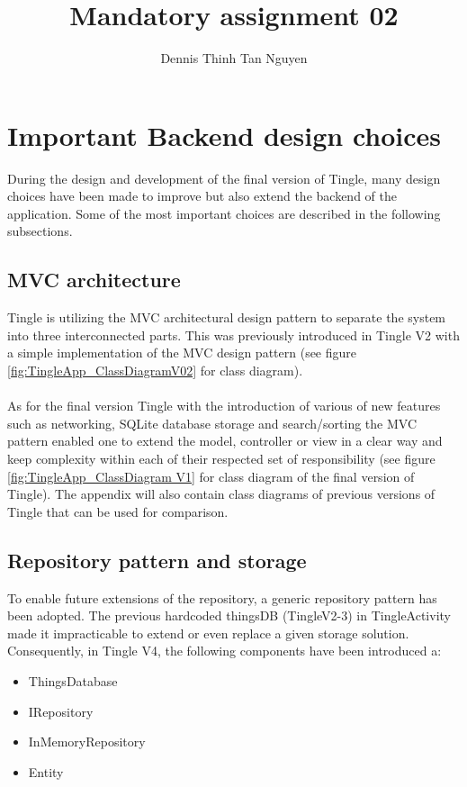 \documentclass{article}
\title{Mandatory assignment 02}
\author{Dennis Thinh Tan Nguyen}
\begin{document}
\maketitle
\newpage
\tableofcontents

\newpage
\section{Important Backend design choices}
During the design and development of the final version of Tingle, many design choices have been made to improve but also extend the backend of the application.
Some of the most important choices are described in the following subsections.


\subsection{MVC architecture}
Tingle is utilizing the MVC architectural design pattern to separate the system into three interconnected parts. This was previously introduced in Tingle V2 with a simple implementation of the MVC design pattern (see figure \ref{fig:TingleApp_ClassDiagramV02} for class diagram).\\\\As for the final version Tingle with the introduction of various of new features such as networking, SQLite database storage and search/sorting the MVC pattern enabled one to extend the model, controller or view in a clear way and keep complexity within each of their respected set of responsibility (see figure \ref{fig:TingleApp_ClassDiagram V1} for class diagram of the final version of Tingle). The appendix will also contain class diagrams of previous versions of Tingle that can be used for comparison.


\subsection{Repository pattern and storage}
To enable future extensions of the repository, a generic repository pattern has been adopted. The previous hardcoded thingsDB (TingleV2-3) in TingleActivity made it impracticable to extend or even replace a given storage solution. Consequently, in Tingle V4, the following components have been introduced a:
\begin{itemize}
	\item ThingsDatabase
	\item IRepository
	\item InMemoryRepository
	\item Entity
\end{itemize}
\end{document}

